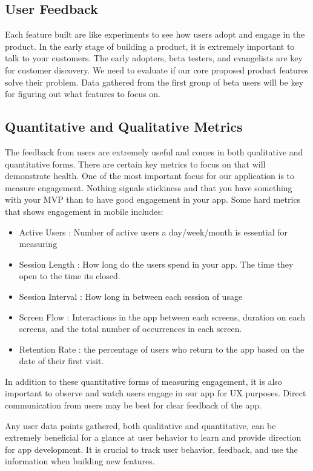 \subsection{User Feedback}
Each feature built are like experiments to see how users adopt and engage in the product. In the early stage of building a product, it is extremely important to talk to your customers. The early adopters, beta testers, and evangelists are key for customer discovery. We need to evaluate if our core proposed product features solve their problem. Data gathered from the first group of beta users will be key for figuring out what features to focus on.

\subsection{Quantitative and Qualitative Metrics}
The feedback from users are extremely useful and comes in both qualitative and quantitative forms. There are certain key metrics to focus on that will demonstrate health. One of the most important focus for our application is to measure engagement. Nothing signals stickiness and that you have something with your MVP than to have good engagement in your app. Some hard metrics that shows engagement in mobile includes:
\begin{itemize}
	\item Active Users : Number of active users a day/week/month is essential for measuring
	\item Session Length : How long do the users spend in your app. The time they open to the time its closed.
	\item Session Interval : How long in between each session of usage
	\item Screen Flow : Interactions in the app between each screens, duration on each screens, and the total number of occurrences in each screen.
	\item Retention Rate : the percentage of users who return to the app based on the date of their first visit.
\end{itemize}

In addition to these quantitative forms of measuring engagement, it is also important to observe and watch users engage in our app for UX purposes.  Direct communication from users may be best for clear feedback of the app.

Any user data points gathered, both qualitative and quantitative, can be extremely beneficial  for a glance at user behavior to learn and provide direction for app development. It is crucial to track user behavior, feedback, and use the information when building new features.


